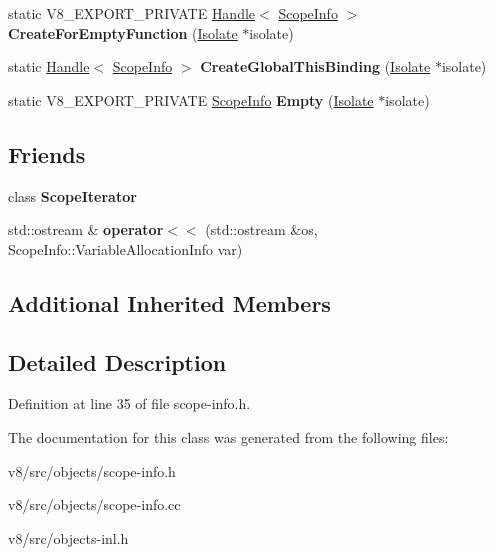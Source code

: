 \begin{DoxyCompactItemize}
\item 
\mbox{\label{classv8_1_1internal_1_1ScopeInfo_a1df30c807ffd88ddce7bbc9ce1e2cc96}} 
static V8\+\_\+\+E\+X\+P\+O\+R\+T\+\_\+\+P\+R\+I\+V\+A\+TE \mbox{\hyperlink{classv8_1_1internal_1_1Handle}{Handle}}$<$ \mbox{\hyperlink{classv8_1_1internal_1_1ScopeInfo}{Scope\+Info}} $>$ {\bfseries Create\+For\+Empty\+Function} (\mbox{\hyperlink{classv8_1_1internal_1_1Isolate}{Isolate}} $\ast$isolate)
\item 
\mbox{\label{classv8_1_1internal_1_1ScopeInfo_aac2e8627b7b93db7e74d99f5d70fea76}} 
static \mbox{\hyperlink{classv8_1_1internal_1_1Handle}{Handle}}$<$ \mbox{\hyperlink{classv8_1_1internal_1_1ScopeInfo}{Scope\+Info}} $>$ {\bfseries Create\+Global\+This\+Binding} (\mbox{\hyperlink{classv8_1_1internal_1_1Isolate}{Isolate}} $\ast$isolate)
\item 
\mbox{\label{classv8_1_1internal_1_1ScopeInfo_a8930f08bc5452012c12a0df5419890f6}} 
static V8\+\_\+\+E\+X\+P\+O\+R\+T\+\_\+\+P\+R\+I\+V\+A\+TE \mbox{\hyperlink{classv8_1_1internal_1_1ScopeInfo}{Scope\+Info}} {\bfseries Empty} (\mbox{\hyperlink{classv8_1_1internal_1_1Isolate}{Isolate}} $\ast$isolate)
\end{DoxyCompactItemize}
\subsection*{Friends}
\begin{DoxyCompactItemize}
\item 
\mbox{\label{classv8_1_1internal_1_1ScopeInfo_a5b3c4fdd7007cd7d1cf8d30b390a3637}} 
class {\bfseries Scope\+Iterator}
\item 
\mbox{\label{classv8_1_1internal_1_1ScopeInfo_af4fe42a5961147efaa8701e5fb29d523}} 
std\+::ostream \& {\bfseries operator$<$$<$} (std\+::ostream \&os, Scope\+Info\+::\+Variable\+Allocation\+Info var)
\end{DoxyCompactItemize}
\subsection*{Additional Inherited Members}


\subsection{Detailed Description}


Definition at line 35 of file scope-\/info.\+h.



The documentation for this class was generated from the following files\+:\begin{DoxyCompactItemize}
\item 
v8/src/objects/scope-\/info.\+h\item 
v8/src/objects/scope-\/info.\+cc\item 
v8/src/objects-\/inl.\+h\end{DoxyCompactItemize}
